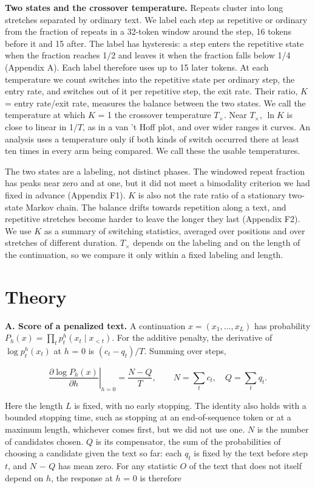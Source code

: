 \documentclass[aps,prx,onecolumn,superscriptaddress,longbibliography]{revtex4-2}
\begin{document}
\textbf{Two states and the crossover temperature.} Repeats cluster into long stretches separated by ordinary text. We label each step as repetitive or ordinary from the fraction of repeats in a 32-token window around the step, 16 tokens before it and 15 after. The label has hysteresis: a step enters the repetitive state when the fraction reaches 1/2 and leaves it when the fraction falls below 1/4 (Appendix A). Each label therefore uses up to 15 later tokens. At each temperature we count switches into the repetitive state per ordinary step, the entry rate, and switches out of it per repetitive step, the exit rate. Their ratio, \(K\) = entry rate/exit rate, measures the balance between the two states. We call the temperature at which \(K\) = 1 the crossover temperature \(T_{\times}\). Near \(T_{\times}\), \(\ln K\) is close to linear in 1/\(T\), as in a van 't Hoff plot, and over wider ranges it curves. An analysis uses a temperature only if both kinds of switch occurred there at least ten times in every arm being compared. We call these the usable temperatures.

The two states are a labeling, not distinct phases. The windowed repeat fraction has peaks near zero and at one, but it did not meet a bimodality criterion we had fixed in advance (Appendix F1). \(K\) is also not the rate ratio of a stationary two-state Markov chain. The balance drifts towards repetition along a text, and repetitive stretches become harder to leave the longer they last (Appendix F2). We use \(K\) as a summary of switching statistics, averaged over positions and over stretches of different duration. \(T_{\times}\) depends on the labeling and on the length of the continuation, so we compare it only within a fixed labeling and length.

\section{Theory}

\textbf{A. Score of a penalized text.} A continuation \(x=(x_1,\ldots,x_L)\) has probability \(P_h(x)=\prod_t p_t^h(x_t\mid x_{<t})\). For the additive penalty, the derivative of \(\log p_t^h(x_t)\) at \(h\) = 0 is \((c_t-q_t)/T\). Summing over steps,

\begin{equation}\left.\frac{\partial \log P_h(x)}{\partial h}\right|_{h=0}=\frac{N-Q}{T},\qquad N=\sum_t c_t,\quad Q=\sum_t q_t.\end{equation}

Here the length \(L\) is fixed, with no early stopping. The identity also holds with a bounded stopping time, such as stopping at an end-of-sequence token or at a maximum length, whichever comes first, but we did not use one. \(N\) is the number of candidates chosen. \(Q\) is its compensator, the sum of the probabilities of choosing a candidate given the text so far: each \(q_{t}\) is fixed by the text before step \(t\), and \(N\) − \(Q\) has mean zero. For any statistic \(O\) of the text that does not itself depend on \(h\), the response at \(h\) = 0 is therefore
\end{document}
